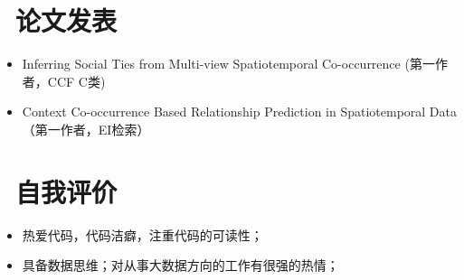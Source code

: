 \documentclass{resume}
\begin{document}
\section{\faLanguage\ 论文发表}
\begin{itemize}[parsep=0.5ex]
  \item Inferring Social Ties from Multi-view Spatiotemporal Co-occurrence (第一作者，CCF C类)
  \item Context Co-occurrence Based Relationship Prediction in Spatiotemporal Data （第一作者，EI检索）
\end{itemize}
\medskip



\section{\faLightbulbO\  自我评价}
\begin{itemize}[parsep=0.5ex]
  \item 热爱代码，代码洁癖，注重代码的可读性；
  \item 具备数据思维；对从事大数据方向的工作有很强的热情；
\end{itemize}
\medskip



%
%
\end{document}
